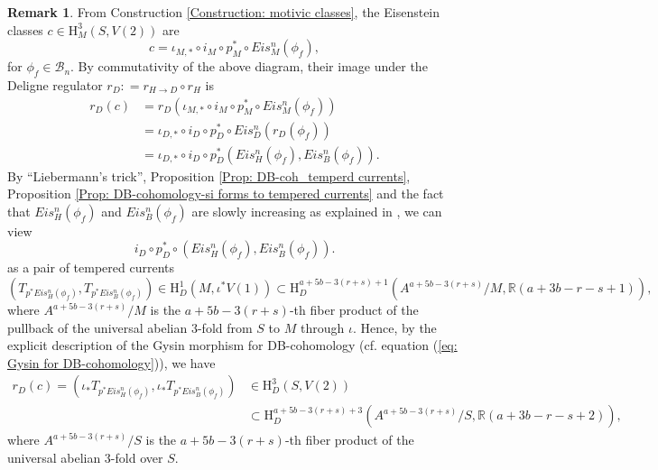 \documentclass[11pt, a4paper]{amsart}
\theoremstyle{plain}
\theoremstyle{definition}
\newtheorem{remark}[theorem]{Remark}
\numberwithin{equation}{section}
\def\RR{\mathbb{R}}
\begin{document}
\begin{remark}
\label{remark: Eis_D class}
    From Construction \ref{Construction: motivic classes}, the Eisenstein classes $c \in \mathrm{H}^{3}_{M}(S, V(2))$ are 
    \begin{equation*}
        c = \iota_{M, *} \circ i_{M} \circ p_{M}^{*} \circ Eis_{M}^{n} (\phi_f), 
    \end{equation*}
    for $\phi_{f} \in \mathcal{B}_{n}$. 
    By commutativity of the above diagram, their image under the Deligne regulator $r_{D}: = r_{H \rightarrow D} \circ r_{H}$ 
    is 
    \begin{align*}
        r_{D}(c) &= r_{D} (\iota_{M, *} \circ i_{M} \circ p_{M}^{*} \circ Eis_{M}^{n} (\phi_f)) \\
                 &= \iota_{D, *} \circ i_{D} \circ p_{D}^{*} \circ Eis_{D}^{n} (r_{D}(\phi_f)) \\
                &= \iota_{D, *} \circ i_{D} \circ p_{D}^{*}(Eis_{H}^{n}(\phi_f), Eis_{B}^{n}(\phi_f)).
    \end{align*}
    By ``Liebermann’s trick'', Proposition \ref{Prop: DB-coh_temperd currents}, Proposition \ref{Prop: DB-cohomology-si forms to tempered currents} and the fact that $Eis_{H}^{n}(\phi_f)$ and $Eis_{B}^{n}(\phi_f)$ are slowly increasing as explained in \cite[page 120]{Kings98}, we can view 
    \begin{equation*}
         i_{D} \circ p_{D}^{*} \circ (Eis_{H}^{n}(\phi_f), Eis_{B}^{n}(\phi_f)). 
    \end{equation*}    
    as a pair of tempered currents 
    \begin{equation*}
        (T_{p^{*}Eis_{H}^{n}(\phi_f)}, T_{p^{*}Eis_{B}^{n}(\phi_f)}) \in \mathrm{H}^{1}_{D} (M, \iota^{*}V(1)) \subset \mathrm{H}^{a + 5b - 3 (r + s) + 1}_{D} (A^{a + 5b - 3 (r + s)} /M, \RR(a + 3b - r - s + 1)), 
    \end{equation*}
    where $A^{a + 5b - 3 (r + s)} /M$ is the $a + 5b - 3(r + s)$-th fiber product of the pullback of the universal abelian $3$-fold from $S$ to $M$ through $\iota$. 
    Hence, by the explicit description of the Gysin morphism for DB-cohomology (cf. equation (\ref{eq: Gysin for DB-cohomology})), we have 
    \begin{align*}
        r_{D}(c) = (\iota_{*}T_{p^{*}Eis_{H}^{n}(\phi_f)}, \iota_{*} T_{p^{*}Eis_{B}^{n}(\phi_f)}) & \in \mathrm{H}^{3}_{D} (S, V(2)) \\ & \subset \mathrm{H}^{a + 5b - 3 (r + s) + 3}_{D} ( A^{a + 5b - 3 (r + s)} /S, \RR(a + 3b -r - s + 2)), 
    \end{align*}
     where $A^{a + 5b - 3 (r + s)} /S$ is the $a + 5b - 3(r + s)$-th fiber product of the universal abelian $3$-fold over $S$. 
\end{remark}
\end{document}
